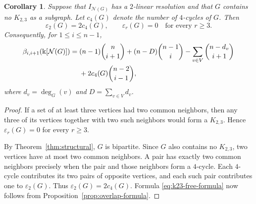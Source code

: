 \documentclass[11pt]{amsart}
\newtheorem{corollary}[theorem]{Corollary}
\theoremstyle{definition}
\theoremstyle{remark}
\numberwithin{equation}{section}
\newcommand{\NN}{\mathcal N}
\begin{document}
	\begin{corollary}\label{cor:k23-free-formula}
		Suppose that \(I_{\NN(G)}\) has a \(2\)-linear resolution and that \(G\)
		contains no \(K_{2,3}\) as a subgraph.
		Let \(c_4(G)\) denote the number of \(4\)-cycles of \(G\). Then
		\[
		\varepsilon_2(G)=2c_4(G),
		\qquad
		\varepsilon_r(G)=0\quad\text{for every }r\ge3.
		\]
		Consequently, for \(1\le i\le n-1\),
		\begin{align}
		\beta_{i,i+1}(\Bbbk[\NN(G)])
		={}&(n-1)\binom n{i+1}
		+(n-D)\binom{n-1}{i}
		-\sum_{v\in V}\binom{n-d_v}{i+1}\notag\\
		&+2c_4(G)\binom{n-2}{i-1},
		\label{eq:k23-free-formula}
		\end{align}
		where \(d_v=\deg_G(v)\) and \(D=\sum_{v\in V}d_v\).
	\end{corollary}

	\begin{proof}
		If a set of at least three vertices had two common neighbors, then any three
		of its vertices together with two such neighbors would form a \(K_{2,3}\).
		Hence \(\varepsilon_r(G)=0\) for every \(r\ge3\).

		By Theorem~\ref{thm:structural}, \(G\) is bipartite. Since \(G\) also
		contains no \(K_{2,3}\), two vertices have at most two
		common neighbors. A pair has exactly two common neighbors precisely when the
		pair and those neighbors form a \(4\)-cycle. Each \(4\)-cycle contributes its
		two pairs of opposite vertices, and each such pair contributes one to
		\(\varepsilon_2(G)\). Thus \(\varepsilon_2(G)=2c_4(G)\). Formula
		\eqref{eq:k23-free-formula} now follows from
		Proposition~\ref{prop:overlap-formula}.
	\end{proof}
\end{document}
